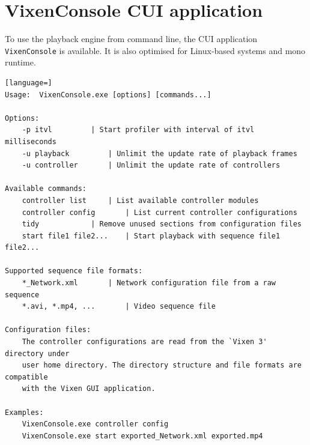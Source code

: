 \section{VixenConsole CUI application}

To use the playback engine from command line, the CUI application \texttt{VixenConsole} is available. It is also optimised for Linux-based systems and mono runtime.

\newpage

\renewcommand{\baselinestretch}{1}
\begin{lstlisting}[language=]
Usage:  VixenConsole.exe [options] [commands...]

Options:
    -p itvl			| Start profiler with interval of itvl milliseconds
    -u playback			| Unlimit the update rate of playback frames
    -u controller		| Unlimit the update rate of controllers

Available commands:
    controller list		| List available controller modules
    controller config		| List current controller configurations
    tidy			| Remove unused sections from configuration files
    start file1 file2...	| Start playback with sequence file1 file2...

Supported sequence file formats:
    *_Network.xml		| Network configuration file from a raw sequence
    *.avi, *.mp4, ...		| Video sequence file

Configuration files:
    The controller configurations are read from the `Vixen 3' directory under
    user home directory. The directory structure and file formats are compatible
    with the Vixen GUI application.

Examples:
    VixenConsole.exe controller config
    VixenConsole.exe start exported_Network.xml exported.mp4
\end{lstlisting}
\renewcommand{\baselinestretch}{\mystretch}
